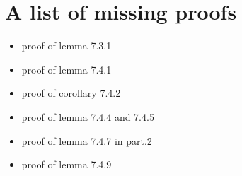 \documentclass[11pt]{article}
\begin{document}
\section{A list of missing proofs}

\begin{itemize}
\item proof of lemma 7.3.1
\item proof of lemma 7.4.1
\item proof of corollary 7.4.2
\item proof of lemma 7.4.4 and 7.4.5
\item proof of lemma 7.4.7 in part.2
\item proof of lemma 7.4.9
\end{itemize}





{}

\end{document}
